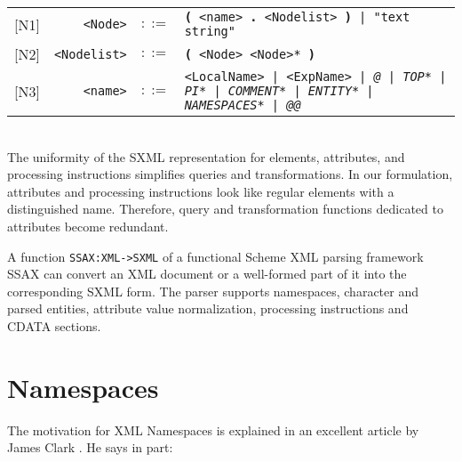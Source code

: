 \documentclass[10pt]{article}
\begin{document}
\begin{tabular}{rrcp{2.8in}}
{[}N1{]} & \texttt{<Node>} &  $::=$ & \texttt{\textbf{(} <name>\textbf{ . }<Nodelist> \textbf{)} | "text string" } \\
{[}N2{]} & \texttt{<Nodelist>} &  $::=$ & \texttt{\textbf{(} <Node> <Node>* \textbf{)} } \\
{[}N3{]} & \texttt{<name>} &  $::=$ & \texttt{<LocalName> | <ExpName> | {\itshape @} | {\itshape *TOP*} | {\itshape *PI*} | {\itshape *COMMENT*} | {\itshape *ENTITY*} | {\itshape *NAMESPACES*} | {\itshape @@} } \\
\end{tabular}
\\
The uniformity of the SXML representation for elements,
attributes, and processing instructions simplifies queries and
transformations. In our formulation, attributes and processing
instructions look like regular elements with a distinguished
name. Therefore, query and transformation functions dedicated to
attributes become redundant.

A function \texttt{SSAX:XML->SXML} of a functional Scheme XML parsing
framework SSAX \cite{SSAX} can convert an XML document or a
well-formed part of it into the corresponding SXML form. The parser
supports namespaces, character and parsed entities, 
attribute value normalization, processing instructions and CDATA
sections.

\section{Namespaces}
The motivation for XML Namespaces is explained in an excellent article by James Clark \cite{Clark1999}. He says in part: 
\end{document}
